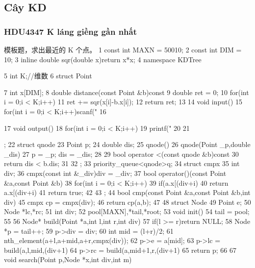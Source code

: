 \documentclass[11pt]{article}
\begin{document}
\subsection{Cây KD}

\subsubsection{HDU4347 K láng giềng gần nhất}

\begin{Code}
     模板题，求出最近的 K 个点。
 1   const int MAXN = 50010;
 2   const int DIM = 10;
 3   inline double sqr(double x){return x*x;}
 4   namespace KDTree{
 5       int K;//维数
 6       struct Point{
 7           int x[DIM];
 8           double distance(const Point &b)const{
 9               double ret = 0;
10               for(int i = 0;i < K;i++)
11                   ret += sqr(x[i]-b.x[i]);
12               return ret;
13           }
14           void input(){
15               for(int i = 0;i < K;i++)scanf("%
16           }


17              void output(){
18                  for(int i = 0;i < K;i++)
19                      printf("%
20              }
21       };
22       struct qnode{
23           Point p;
24           double dis;
25           qnode(){}
26           qnode(Point _p,double _dis){
27               p = _p; dis = _dis;
28           }
29           bool operator <(const qnode &b)const{
30               return dis < b.dis;
31           }
32       };
33       priority_queue<qnode>q;
34       struct cmpx{
35           int div;
36           cmpx(const int &_div){div = _div;}
37           bool operator()(const Point &a,const Point &b){
38               for(int i = 0;i < K;i++)
39                    if(a.x[(div+i)%
40                        return a.x[(div+i)%
41               return true;
42           }
43       };
44       bool cmp(const Point &a,const Point &b,int div){
45           cmpx cp = cmpx(div);
46           return cp(a,b);
47       }
48       struct Node{
49           Point e;
50           Node *lc,*rc;
51           int div;
52       }pool[MAXN],*tail,*root;
53       void init(){
54           tail = pool;
55       }
56       Node* build(Point *a,int l,int r,int div){
57           if(l >= r)return NULL;
58           Node *p = tail++;
59           p->div = div;
60           int mid = (l+r)/2;
61           nth_element(a+l,a+mid,a+r,cmpx(div));
62           p->e = a[mid];
63           p->lc = build(a,l,mid,(div+1)%
64           p->rc = build(a,mid+1,r,(div+1)%
65           return p;
66       }
67       void search(Point p,Node *x,int div,int m){


}}
\end{Code}
\end{document}
